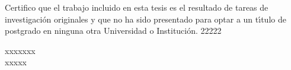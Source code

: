 


\setcounter{tocdepth}{5}



%

%

\renewcommand{\tablename}{Tabla}
\renewcommand{\listtablename}{{\'I}ndice de tablas}


\thispagestyle{empty}%
Certifico que el trabajo incluido en esta tesis es el resultado de tareas de investigaci{\'o}n originales y que no ha sido presentado para optar a un t{\'\i}tulo de postgrado en ninguna otra
Universidad o Instituci{\'o}n. 22222\\
\vspace{0.5cm}
\begin{flushright}
\large{}\selectfont
xxxxxxx\\
\normalsize\sffamily
xxxxx
\end{flushright}

%

%

%
%
    
\tableofcontents


\renewcommand{\baselinestretch}{1.2} %



